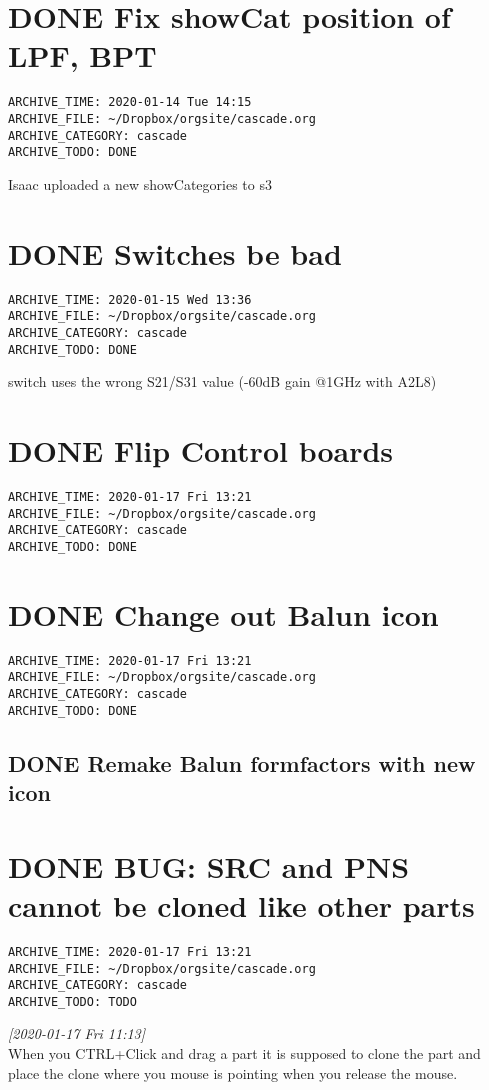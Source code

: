 \documentclass[11pt]{article}
\begin{document}
\section*{{\bfseries\sffamily DONE}  Fix showCat position of LPF, BPT}
\label{sec:orgf1ac7dc}
\begin{verbatim}
ARCHIVE_TIME: 2020-01-14 Tue 14:15
ARCHIVE_FILE: ~/Dropbox/orgsite/cascade.org
ARCHIVE_CATEGORY: cascade
ARCHIVE_TODO: DONE
\end{verbatim}
Isaac uploaded a new showCategories to s3\\
\section*{{\bfseries\sffamily DONE}  Switches be bad}
\label{sec:org1125df4}
\begin{verbatim}
ARCHIVE_TIME: 2020-01-15 Wed 13:36
ARCHIVE_FILE: ~/Dropbox/orgsite/cascade.org
ARCHIVE_CATEGORY: cascade
ARCHIVE_TODO: DONE
\end{verbatim}
switch uses the wrong S21/S31 value (-60dB gain @1GHz with A2L8)\\

\section*{{\bfseries\sffamily DONE}  Flip Control boards}
\label{sec:orgb31aff7}
\begin{verbatim}
ARCHIVE_TIME: 2020-01-17 Fri 13:21
ARCHIVE_FILE: ~/Dropbox/orgsite/cascade.org
ARCHIVE_CATEGORY: cascade
ARCHIVE_TODO: DONE
\end{verbatim}
\section*{{\bfseries\sffamily DONE}  Change out Balun icon}
\label{sec:orgcc99ea6}
\begin{verbatim}
ARCHIVE_TIME: 2020-01-17 Fri 13:21
ARCHIVE_FILE: ~/Dropbox/orgsite/cascade.org
ARCHIVE_CATEGORY: cascade
ARCHIVE_TODO: DONE
\end{verbatim}
\subsection*{{\bfseries\sffamily DONE}  Remake Balun formfactors with new icon}
\label{sec:orgb5e9c60}
\section*{{\bfseries\sffamily DONE}  BUG: SRC and PNS cannot be cloned like other parts}
\label{sec:org882c760}
\begin{verbatim}
ARCHIVE_TIME: 2020-01-17 Fri 13:21
ARCHIVE_FILE: ~/Dropbox/orgsite/cascade.org
ARCHIVE_CATEGORY: cascade
ARCHIVE_TODO: TODO
\end{verbatim}
\textit{[2020-01-17 Fri 11:13]}\\
When you CTRL+Click and drag a part it is supposed to clone the part and place the clone where you mouse is pointing when you release the mouse.\\
\end{document}
